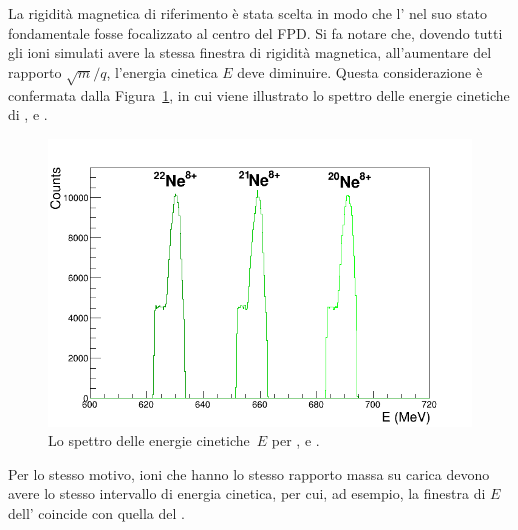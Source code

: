 La rigidità magnetica di riferimento è stata scelta in modo che l' nel suo stato fondamentale fosse focalizzato al centro del FPD.
Si fa notare che, dovendo tutti gli ioni simulati avere la stessa finestra di rigidità magnetica, all'aumentare del rapporto $\sqrt{m}/q$, l'energia cinetica $E$ deve diminuire.
Questa considerazione è confermata dalla Figura~\ref{fig:KinE}, in cui viene illustrato lo spettro delle energie cinetiche di ,  e .
\begin{figure} [!p]
	\centering
	\includegraphics[width=\textwidth, keepaspectratio]{Grafici_Tesi2/PIDnew/ekin.png}
	\caption{Lo spettro delle energie cinetiche~$E$ per ,  e .} \label{fig:KinE}
\end{figure}
Per lo stesso motivo, ioni che hanno lo stesso rapporto massa su carica devono avere lo stesso intervallo di energia cinetica, per cui, ad esempio, la finestra di $E$ dell' coincide con quella del .


